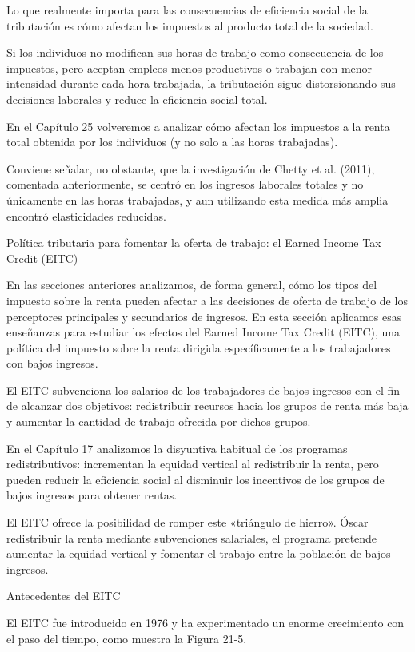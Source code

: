 \documentclass[10pt,a4paper]{article}
\begin{document}
Lo que realmente importa para las consecuencias de eficiencia social de la tributación es cómo afectan los impuestos al producto total de la sociedad.

Si los individuos no modifican sus horas de trabajo como consecuencia de los impuestos, pero aceptan empleos menos productivos o trabajan con menor intensidad durante cada hora trabajada, la tributación sigue distorsionando sus decisiones laborales y reduce la eficiencia social total.

En el Capítulo 25 volveremos a analizar cómo afectan los impuestos a la renta total obtenida por los individuos (y no solo a las horas trabajadas).

Conviene señalar, no obstante, que la investigación de Chetty et al. (2011), comentada anteriormente, se centró en los ingresos laborales totales y no únicamente en las horas trabajadas, y aun utilizando esta medida más amplia encontró elasticidades reducidas.

Política tributaria para fomentar la oferta de trabajo: el Earned Income Tax Credit (EITC)

En las secciones anteriores analizamos, de forma general, cómo los tipos del impuesto sobre la renta pueden afectar a las decisiones de oferta de trabajo de los perceptores principales y secundarios de ingresos. En esta sección aplicamos esas enseñanzas para estudiar los efectos del Earned Income Tax Credit (EITC), una política del impuesto sobre la renta dirigida específicamente a los trabajadores con bajos ingresos.

El EITC subvenciona los salarios de los trabajadores de bajos ingresos con el fin de alcanzar dos objetivos: redistribuir recursos hacia los grupos de renta más baja y aumentar la cantidad de trabajo ofrecida por dichos grupos.

En el Capítulo 17 analizamos la disyuntiva habitual de los programas redistributivos: incrementan la equidad vertical al redistribuir la renta, pero pueden reducir la eficiencia social al disminuir los incentivos de los grupos de bajos ingresos para obtener rentas.

El EITC ofrece la posibilidad de romper este «triángulo de hierro». Óscar redistribuir la renta mediante subvenciones salariales, el programa pretende aumentar la equidad vertical y fomentar el trabajo entre la población de bajos ingresos.

Antecedentes del EITC

El EITC fue introducido en 1976 y ha experimentado un enorme crecimiento con el paso del tiempo, como muestra la Figura 21-5.
\end{document}
